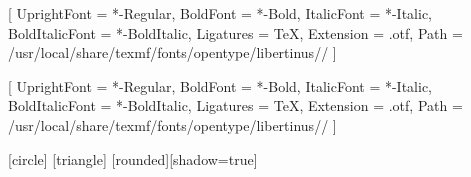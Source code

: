 \usepackage{fontspec}

\def\installpath{/usr/local/share/texmf/fonts/opentype/libertinus/}
\setmainfont{LibertinusSerif}[
UprightFont    = *-Regular,
BoldFont       = *-Bold,
ItalicFont     = *-Italic,
BoldItalicFont = *-BoldItalic,
Ligatures      = TeX,
Extension      = .otf,
Path           = \installpath/
]

\setsansfont{LibertinusSerif}[
UprightFont    = *-Regular,
BoldFont       = *-Bold,
ItalicFont     = *-Italic,
BoldItalicFont = *-BoldItalic,
Ligatures      = TeX,
Extension      = .otf,
Path           = \installpath/
]








\newcommand\Wider[2][3em]{%
	\makebox[\linewidth][c]{%
		\begin{minipage}{\dimexpr\textwidth+#1\relax}
			\raggedright#2
		\end{minipage}%
	}%
}


\newcommand {\framedgraphic}[1] {
	\begin{figure}
		\centering
		\texttt{[image: \#1]}
	\end{figure}
}


\newcommand {\framedgraphiccaption}[2] {
	\begin{figure}
		\centering
		\texttt{[image: \#1]}
		\caption{#2}
	\end{figure}
}




[circle]
[triangle]
[rounded][shadow=true]


